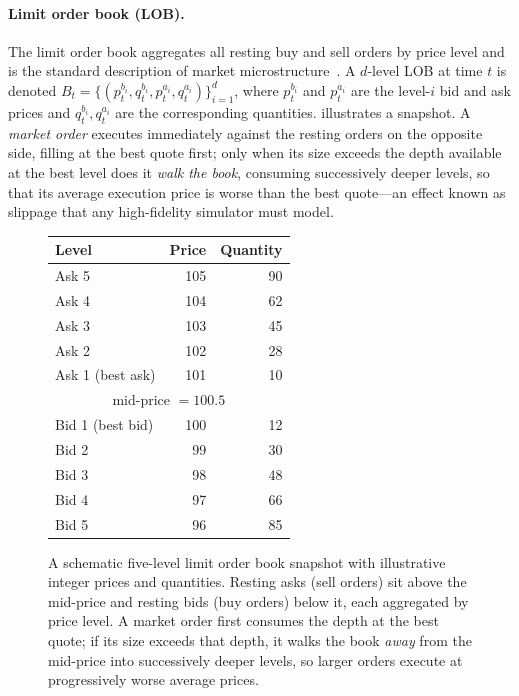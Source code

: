 \paragraph{Limit order book (LOB).} The limit order book aggregates all resting buy and sell orders by price level and is the standard description of market microstructure~\cite{madhavan2000market}. A $d$-level LOB at time $t$ is denoted $B_t=\{(p_t^{b_i},q_t^{b_i},p_t^{a_i},q_t^{a_i})\}_{i=1}^{d}$, where $p_t^{b_i}$ and $p_t^{a_i}$ are the level-$i$ bid and ask prices and $q_t^{b_i},q_t^{a_i}$ are the corresponding quantities.  illustrates a snapshot. A \emph{market order} executes immediately against the resting orders on the opposite side, filling at the best quote first; only when its size exceeds the depth available at the best level does it \emph{walk the book}, consuming successively deeper levels, so that its average execution price is worse than the best quote---an effect known as slippage that any high-fidelity simulator must model.

\begin{figure}[!htb]
  \centering
  \begin{tabular}{lrr}
    \toprule
    Level & Price & Quantity \\
    \midrule
    Ask 5 & 105 & 90 \\
    Ask 4 & 104 & 62 \\
    Ask 3 & 103 & 45 \\
    Ask 2 & 102 & 28 \\
    Ask 1 (best ask) & 101 & 10 \\
    \midrule
    \multicolumn{3}{c}{mid-price $=100.5$} \\
    \midrule
    Bid 1 (best bid) & 100 & 12 \\
    Bid 2 & 99 & 30 \\
    Bid 3 & 98 & 48 \\
    Bid 4 & 97 & 66 \\
    Bid 5 & 96 & 85 \\
    \bottomrule
  \end{tabular}
  \caption[A limit order book snapshot.]{A schematic five-level limit order book snapshot with illustrative integer prices and quantities. Resting asks (sell orders) sit above the mid-price and resting bids (buy orders) below it, each aggregated by price level. A market order first consumes the depth at the best quote; if its size exceeds that depth, it walks the book \emph{away} from the mid-price into successively deeper levels, so larger orders execute at progressively worse average prices.}
  \label{fig:bg_lob}
\end{figure}

